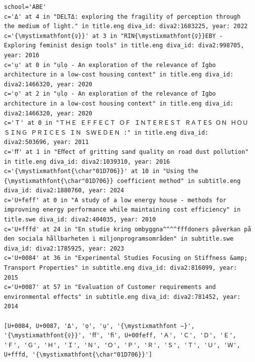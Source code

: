 \documentclass[12pt, twoside]{article}
\begin{document}
\begin{lstlisting}[style=latexExampleForAuthors, 
caption={Part of the output about characters missing from Figtree that were used in DiVA in English and Swedish titles and subtitles - for the ABE school. Note that not all of the characters can be shown in the font used in this document. However, they can be seen in the output when you run the notebook. Here, these characters have been manually edited to use another font where the character exists.},
label=lst:missingFigtreeABE]
\end{lstlisting}
\begin{Verbatim}[breaklines=true, commandchars=\\\{\}]
school='ABE'
c='Δ' at 4 in "DELTΔ: exploring the fragility of perception through the medium of light." in title.eng diva_id: diva2:1683225, year: 2022
c='{\mystixmathfont{♀}}' at 3 in "RIN{\mystixmathfont{♀}}EBY - Exploring feminist design tools" in title.eng diva_id: diva2:998705, year: 2016
c='ụ' at 0 in "ụlọ - An exploration of the relevance of Igbo architecture in a low-cost housing context" in title.eng diva_id: diva2:1466320, year: 2020
c='ọ' at 2 in "ụlọ - An exploration of the relevance of Igbo architecture in a low-cost housing context" in title.eng diva_id: diva2:1466320, year: 2020
c='Ｔ' at 0 in "ＴＨＥ ＥＦＦＥＣＴ ＯＦ ＩＮＴＥＲＥＳＴ ＲＡＴＥS ＯＮ ＨＯＵＳＩＮＧ ＰＲＩＣＥＳ ＩＮ ＳＷＥＤＥＮ :" in title.eng diva_id: diva2:503696, year: 2011
c='ﬀ' at 1 in "Eﬀect of gritting sand quality on road dust pollution" in title.eng diva_id: diva2:1039310, year: 2016
c='{\mystixmathfont{\char"01D706}}' at 10 in "Using the {\mystixmathfont{\char"01D706}} coefficient method" in subtitle.eng diva_id: diva2:1880760, year: 2024
c='U+feff' at 0 in "﻿﻿﻿A study of a low energy house - methods for improvning energy performance while maintaining cost efficiency" in title.swe diva_id: diva2:404035, year: 2010
c='U+fffd' at 24 in "En studie kring ombyggna^^^^fffdoners påverkan på den sociala hållbarheten i miljonprogramsområden" in subtitle.swe diva_id: diva2:1785925, year: 2023
c='U+0084' at 36 in "Experimental Studies Focusing on Stiffness &amp; Transport Properties" in subtitle.eng diva_id: diva2:816099, year: 2015
c='U+0087' at 57 in "Evaluation of Customer requirements and environmental effects" in subtitle.eng diva_id: diva2:781452, year: 2014

[U+0084, U+0087, 'Δ', 'ọ', 'ụ', '{\mystixmathfont ―}', '{\mystixmathfont{♀}}', 'ﬀ', 'ﬁ', U+00feff, 'Ａ', 'Ｃ', 'Ｄ', 'Ｅ', 'Ｆ', 'Ｇ', 'Ｈ', 'Ｉ', 'Ｎ', 'Ｏ', 'Ｐ', 'Ｒ', 'Ｓ', 'Ｔ', 'Ｕ', 'Ｗ',  U+fffd, '{\mystixmathfont{\char"01D706}}']
\end{Verbatim}
\FloatBarrier
\end{document}
